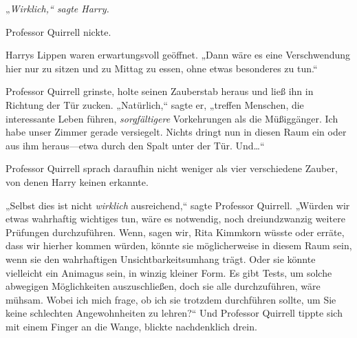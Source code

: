 {%
„\emph{Wirklich,“ sagte Harry.}

Professor Quirrell nickte.

Harrys Lippen waren erwartungsvoll geöffnet. „Dann wäre es eine Verschwendung hier nur zu sitzen und zu Mittag zu essen, ohne etwas besonderes zu tun.“

Professor Quirrell grinste, holte seinen Zauberstab heraus und ließ ihn in Richtung der Tür zucken. „Natürlich,“ sagte er, „treffen Menschen, die interessante Leben führen, \emph{sorgfältigere} Vorkehrungen als die Müßiggänger. Ich habe unser Zimmer gerade versiegelt. Nichts dringt nun in diesen Raum ein oder aus ihm heraus—etwa durch den Spalt unter der Tür. Und…“

Professor Quirrell sprach daraufhin nicht weniger als vier verschiedene Zauber, von denen Harry keinen erkannte.

„Selbst dies ist nicht \emph{wirklich} ausreichend,“ sagte Professor Quirrell. „Würden wir etwas wahrhaftig wichtiges tun, wäre es notwendig, noch dreiundzwanzig weitere Prüfungen durchzuführen. Wenn, sagen wir, Rita Kimmkorn wüsste oder erräte, dass wir hierher kommen würden, könnte sie möglicherweise in diesem Raum sein, wenn sie den wahrhaftigen Unsichtbarkeitsumhang trägt. Oder sie könnte vielleicht ein Animagus sein, in winzig kleiner Form. Es gibt Tests, um solche abwegigen Möglichkeiten auszuschließen, doch sie alle durchzuführen, wäre mühsam. Wobei ich mich frage, ob ich sie trotzdem durchführen sollte, um Sie keine schlechten Angewohnheiten zu lehren?“ Und Professor Quirrell tippte sich mit einem Finger an die Wange, blickte nachdenklich drein.

}
